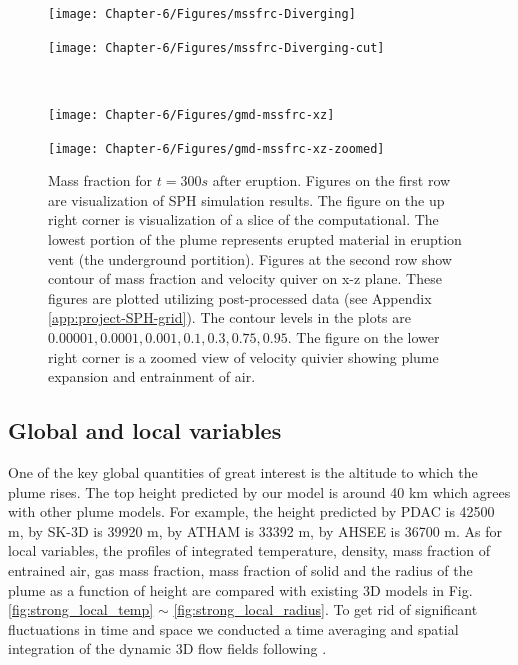 \begin{figure}
    \centering
    \begin{minipage}{.45\textwidth}
        \centering
        \texttt{[image: Chapter-6/Figures/mssfrc-Diverging]}
    \end{minipage}%
    \begin{minipage}{.45 \textwidth}
        \centering
        \texttt{[image: Chapter-6/Figures/mssfrc-Diverging-cut]}
    \end{minipage}%
    \\
    \begin{minipage}{.45 \textwidth}
        \centering
        \texttt{[image: Chapter-6/Figures/gmd-mssfrc-xz]}
    \end{minipage}%
    \begin{minipage}{.45 \textwidth}
        \centering
        \texttt{[image: Chapter-6/Figures/gmd-mssfrc-xz-zoomed]}
    \end{minipage}%
    \caption{Mass fraction for $t=300s$ after eruption. Figures on the first row are visualization of SPH simulation results. The figure on the up right corner is visualization of a slice of the computational. The lowest portion of the plume represents erupted material in eruption vent (the underground portition). Figures at the second row show contour of mass fraction and velocity quiver on x-z plane. These figures are plotted utilizing post-processed data (see Appendix \ref{app:project-SPH-grid}). The contour levels in the plots are $0.00001, 0.0001, 0.001, 0.1, 0.3, 0.75, 0.95$. The figure on the lower right corner is a zoomed view of velocity quivier showing plume expansion and entrainment of air.}
    \label{fig:pinatubo-simulation-results-vis}
\end{figure}

\subsection{Global and local variables}
One of the key global quantities of great interest is the altitude to which the plume rises. The top height predicted by our model is around 40 km which agrees with other plume models. For example, the height predicted by PDAC is 42500 m, by SK-3D is 39920 m, by ATHAM is 33392 m, by AHSEE is 36700 m. As for local variables, the profiles of integrated temperature, density, mass fraction of entrained air, gas mass fraction, mass fraction of solid and the radius of the plume as a function of height are compared with existing 3D models in Fig. \ref{fig:strong_local_temp} $\sim$ \ref{fig:strong_local_radius}. To get rid of significant fluctuations in time and space we conducted a time averaging and spatial integration of the dynamic 3D flow fields following \citet {cerminara2016large}.

